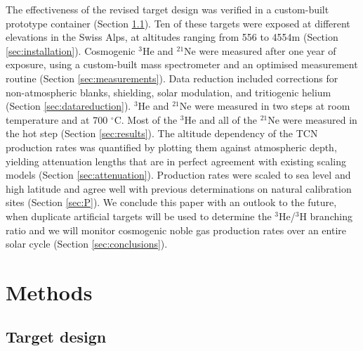 \documentclass{article}
\begin{document}
The  effectiveness of  the revised  target  design was  verified in  a
custom-built prototype  container (Section \ref{sec:design}).   Ten of
these targets were exposed at  different elevations in the Swiss Alps,
at    altitudes     ranging    from    556     to    4554m    (Section
\ref{sec:installation}). Cosmogenic $^3$He and $^{21}$Ne were measured
after one year of exposure, using a custom-built mass spectrometer and
an  optimised  measurement  routine (Section  \ref{sec:measurements}).
Data  reduction  included   corrections  for  non-atmospheric  blanks,
shielding,   solar  modulation,   and   tritiogenic  helium   (Section
\ref{sec:datareduction}).  $^3$He  and $^{21}$Ne were  measured in two
steps at room  temperature and at 700 $^{\circ}$C.  Most of the $^3$He
and  all of  the  $^{21}$Ne were  measured  in the  hot step  (Section
\ref{sec:results}).   The altitude  dependency of  the  TCN production
rates  was  quantified by  plotting  them  against atmospheric  depth,
yielding  attenuation  lengths  that  are in  perfect  agreement  with
existing  scaling models (Section  \ref{sec:attenuation}).  Production
rates were scaled  to sea level and high latitude  and agree well with
previous   determinations  on   natural  calibration   sites  (Section
\ref{sec:P}).  We conclude  this paper with an outlook  to the future,
when  duplicate  artificial targets  will  be  used  to determine  the
$^3$He/$^3$H branching ratio and  we will monitor cosmogenic noble gas
production    rates   over    an   entire    solar    cycle   (Section
\ref{sec:conclusions}).

\section{Methods}\label{sec:methods}

\subsection{Target design}\label{sec:design}
\end{document}
